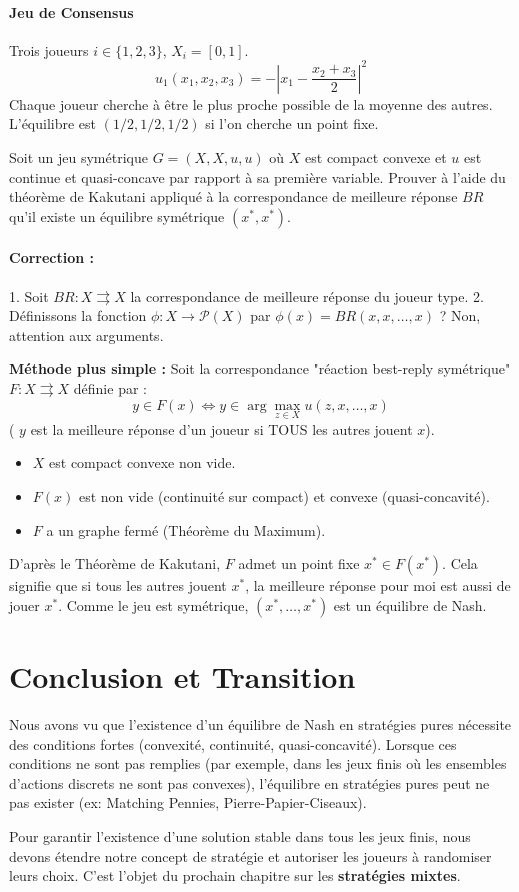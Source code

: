 \paragraph{Jeu de Consensus}
Trois joueurs $i \in \{1,2,3\}$, $X_i = [0,1]$.
\[ u_1(x_1, x_2, x_3) = - \left| x_1 - \frac{x_2 + x_3}{2} \right|^2 \]
Chaque joueur cherche à être le plus proche possible de la moyenne des autres.
L'équilibre est $(1/2, 1/2, 1/2)$ si l'on cherche un point fixe.

\begin{exercice}
Soit un jeu symétrique $G = (X, X, u, u)$ où $X$ est compact convexe et $u$ est continue et quasi-concave par rapport à sa première variable. Prouver à l'aide du théorème de Kakutani appliqué à la correspondance de meilleure réponse $BR$ qu'il existe un équilibre symétrique $(x^*, x^*)$.
\paragraph{Correction :}
1. Soit $BR : X \rightrightarrows X$ la correspondance de meilleure réponse du joueur type.
2. Définissons la fonction $\phi : X \to \mathcal{P}(X)$ par $\phi(x) = BR(x, x, \dots, x)$ ? Non, attention aux arguments.
   
   \textbf{Méthode plus simple :}
   Soit la correspondance "réaction best-reply symétrique" $F: X \rightrightarrows X$ définie par :
   $$ y \in F(x) \iff y \in \arg\max_{z \in X} u(z, x, \dots, x) $$
   ( $y$ est la meilleure réponse d'un joueur si TOUS les autres jouent $x$).
   
   \begin{itemize}
       \item $X$ est compact convexe non vide.
       \item $F(x)$ est non vide (continuité sur compact) et convexe (quasi-concavité).
       \item $F$ a un graphe fermé (Théorème du Maximum).
   \end{itemize}
   D'après le Théorème de Kakutani, $F$ admet un point fixe $x^* \in F(x^*)$.
   Cela signifie que si tous les autres jouent $x^*$, la meilleure réponse pour moi est aussi de jouer $x^*$.
   Comme le jeu est symétrique, $(x^*, \dots, x^*)$ est un équilibre de Nash.
\end{exercice}

\section{Conclusion et Transition}
Nous avons vu que l'existence d'un équilibre de Nash en stratégies pures nécessite des conditions fortes (convexité, continuité, quasi-concavité). Lorsque ces conditions ne sont pas remplies (par exemple, dans les jeux finis où les ensembles d'actions discrets ne sont pas convexes), l'équilibre en stratégies pures peut ne pas exister (ex: Matching Pennies, Pierre-Papier-Ciseaux).

Pour garantir l'existence d'une solution stable dans tous les jeux finis, nous devons étendre notre concept de stratégie et autoriser les joueurs à randomiser leurs choix. C'est l'objet du prochain chapitre sur les \textbf{stratégies mixtes}.
